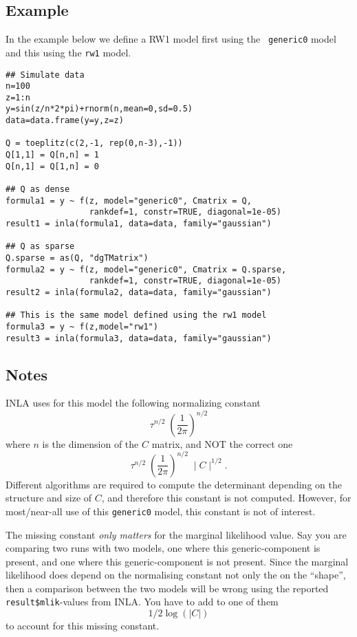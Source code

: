 \documentclass[a4paper,11pt]{article}
\begin{document}
\subsection*{Example}
In the example below we define a RW1 model first using the {\tt
    generic0} model and this using the {\tt rw1} model.
\begin{verbatim}
## Simulate data
n=100
z=1:n
y=sin(z/n*2*pi)+rnorm(n,mean=0,sd=0.5)
data=data.frame(y=y,z=z)

Q = toeplitz(c(2,-1, rep(0,n-3),-1))
Q[1,1] = Q[n,n] = 1
Q[n,1] = Q[1,n] = 0

## Q as dense
formula1 = y ~ f(z, model="generic0", Cmatrix = Q,
                 rankdef=1, constr=TRUE, diagonal=1e-05)
result1 = inla(formula1, data=data, family="gaussian")

## Q as sparse
Q.sparse = as(Q, "dgTMatrix")
formula2 = y ~ f(z, model="generic0", Cmatrix = Q.sparse,
                 rankdef=1, constr=TRUE, diagonal=1e-05)
result2 = inla(formula2, data=data, family="gaussian")

## This is the same model defined using the rw1 model
formula3 = y ~ f(z,model="rw1")
result3 = inla(formula3, data=data, family="gaussian")
\end{verbatim}

\subsection*{Notes}

INLA uses for this model the following normalizing constant
\begin{displaymath}
    \tau^{n/2}\; \left(\frac{1}{2\pi}\right)^{n/2}
\end{displaymath}
where $n$ is the dimension of the $C$ matrix, and NOT the correct one
\begin{displaymath}
    \tau^{n/2}\; \left(\frac{1}{2\pi}\right)^{n/2}\; \mid C\mid^{1/2}.
\end{displaymath}
Different algorithms are required to compute the determinant depending
on the structure and size of $C$, and therefore this constant is not
computed. However, for most/near-all use of this \texttt{generic0}
model, this constant is not of interest.

The missing constant \emph{only matters} for the marginal likelihood
value.  Say you are comparing two runs with two models, one where this
generic-component is present, and one where this generic-component is
not present. Since the marginal likelihood does depend on the
normalising constant not only the on the ``shape'', then a comparison
between the two models will be wrong using the reported
\verb|result$mlik|-values from INLA. You have to add to one of them
\begin{displaymath}
    1/2 \log(|C|)
\end{displaymath}
to account for this missing constant.
\end{document}
